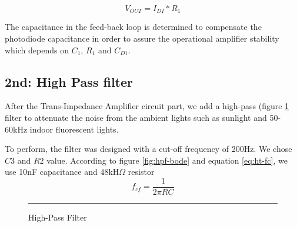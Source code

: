 \begin{equation}
V_{OUT}  = I_{DI} * R_{1}
\label{eq:vout}
\end{equation}

The capacitance in the feed-back loop is determined to compensate the photodiode capacitance in order to assure the operational amplifier stability which depends on $C_1$, $R_1$ and $C_{D1}$.

\subsection{2nd: High Pass filter}

After the Trans-Impedance Amplifier circuit part, we add a high-pass (figure \ref{fig:hpf} filter to attenuate the noise from the ambient lights such as sunlight and 50-60kHz indoor fluorescent lights.

To perform, the filter was designed with a cut-off frequency of 200Hz. We chose $C3$ and $R2$ value. According to figure \ref{fig:hpf-bode} and equation \ref{eq:ht-fc}, we use 10nF capacitance and 48kH$\Omega$ resistor
\begin{equation}
f_{cf}  = \frac{1}{2\pi RC}
\label{eq:ht-fc}
\end{equation}

\begin{figure}[htbp]
    \centering
    \rule{35em}{0.5pt}
    \caption{High-Pass Filter}
    \label{fig:hpf}
\end{figure}

